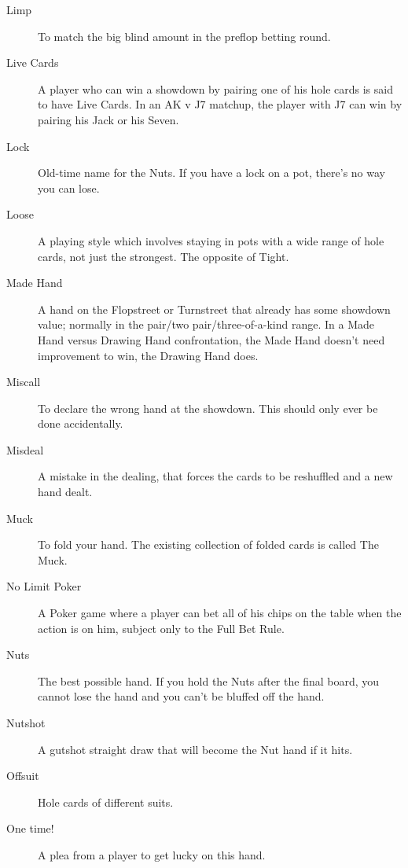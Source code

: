 \begin{description}
\item[Limp] To match the big blind amount in the preflop betting
round.

\item[Live Cards] A player who can win a showdown by pairing one of
his hole cards is said to have Live Cards. In an AK v J7 matchup, the
player with J7 can win by pairing his Jack or his Seven.

\item[Lock] Old-time name for the Nuts. If you have a lock on a pot,
there's no way you can lose.

\item[Loose] A playing style which involves staying in pots with a
wide range of hole cards, not just the strongest. The opposite of
Tight.

\item[Made Hand] A hand on the Flopstreet or Turnstreet that already
has some showdown value; normally in the pair/two pair/three-of-a-kind
range. In a Made Hand versus Drawing Hand confrontation, the Made Hand
doesn't need improvement to win, the Drawing Hand does.

\item[Miscall] To declare the wrong hand at the showdown. This should
only ever be done accidentally.

\item[Misdeal] A mistake in the dealing, that forces the cards to be
reshuffled and a new hand dealt.

\item[Muck] To fold your hand. The existing collection of folded cards
is called The Muck.

\item[No Limit Poker] A Poker game where a player can bet all of his
chips on the table when the action is on him, subject only to the Full
Bet Rule.

\item[Nuts] The best possible hand. If you hold the Nuts
after the final board, you cannot lose the hand and you can't be
bluffed off the hand.

\item[Nutshot] A gutshot straight draw that will become the Nut hand
if it hits.

\item[Offsuit] Hole cards of different suits.

\item[One time!] A plea from a player to get lucky on this hand.


\end{description}
